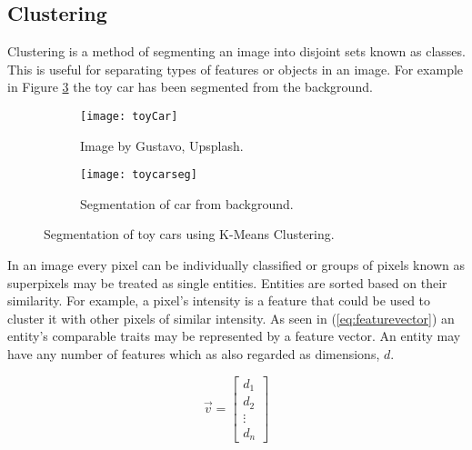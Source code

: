 \subsection{Clustering}
Clustering is a method of segmenting an image into disjoint sets known as classes. This is useful for separating types of features or objects in an image. For example in Figure \ref{fig:toycar} the toy car has been segmented from the background.

\begin{figure}[H]
	\centering
	\begin{subfigure}[b]{0.5\linewidth}
      		\centering\texttt{[image: toyCar]}
      		\caption{Image by Gustavo, Upsplash.}
		    \label{fig:toycarA}
    	\end{subfigure}%
    	\begin{subfigure}[b]{0.5\linewidth}
      		\centering\texttt{[image: toycarseg]}
      		\caption{Segmentation of car from background.}
       		\label{fig:toycarB}
    	\end{subfigure}
    	\caption{Segmentation of toy cars using K-Means Clustering.}
    	\label{fig:toycar}
\end{figure} 

In an image every pixel can be individually classified or groups of pixels known as superpixels may be treated as single entities. Entities are sorted based on their similarity. For example, a pixel's intensity is a feature that could be used to cluster it with other pixels of similar intensity. As seen in (\ref{eq:featurevector}) an entity's comparable traits may be represented by a feature vector. An entity may have any number of features which as also regarded as dimensions, $d$. 

\begin{equation}
    \vec{v} = 
    \begin{bmatrix}
        d_1 \\
        d_2 \\
        \vdots \\ 
        d_n
    \end{bmatrix}
    \label{eq:featurevector}
\end{equation}




